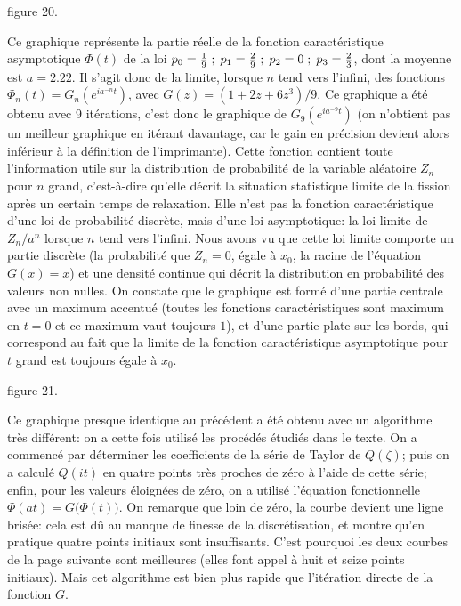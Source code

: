 \null
\vskip3pt
\centerline{ }
\vskip7mm
\centerline{\eightpoint figure 20.}
\vskip3mm
{\eightpoint\baselineskip=14pt
Ce graphique repr\'esente la partie r\'eelle de la fonction 
caract\'eristique asymptotique $\Phi (t)$ de la loi $p_0 = {1\over 9}
\;   ;\; p_1 = {2\over 9}\; ;\; p_2 = 0\; ;\; p_3 = {2\over 3}$, dont la
moyenne est $a = 2.22$. Il s'agit donc de la limite, lorsque $n$ tend vers 
l'infini, des fonctions $\Phi_n(t) = G_n(e^{ia^{-n}t})$, avec $G(z) = (1 + 
2z + 6z^3)/9$. Ce graphique a \'et\'e obtenu avec 9 it\'erations, c'est
donc   le graphique de $G_9(e^{ia^{-9}t})$ (on n'obtient pas un meilleur 
graphique en it\'erant davantage, car le gain en pr\'ecision devient alors 
inf\'erieur \`a la d\'efinition de l'imprimante). 
\medskip
Cette fonction contient toute l'information utile sur la distribution
de probabilit\'e de la variable al\'eatoire $Z_n$ pour $n$ grand, 
c'est-\`a-dire qu'elle d\'ecrit la situation statistique limite de la 
fission apr\`es un certain temps de relaxation. Elle n'est pas la fonction
caract\'eristique d'une loi de probabilit\'e discr\`ete, mais d'une
loi asymptotique: la loi limite de  $Z_n / a^n$ lorsque $n$ tend vers
l'infini. Nous avons vu que cette loi limite comporte un partie discr\`ete
(la probabilit\'e que $Z_n=0$, \'egale \`a $x_0$, la racine
de l'\'equation $G(x) = x$) et une densit\'e continue qui d\'ecrit
la distribution en probabilit\'e des valeurs non nulles. On constate que 
le graphique est form\'e d'une partie centrale avec un maximum 
accentu\'e (toutes les fonctions caract\'eristiques sont maximum en
$t=0$ et ce maximum vaut toujours $1$), et d'une partie plate sur les
bords, qui correspond au fait que la limite de la fonction 
caract\'eristique asymptotique pour $t$ grand est toujours \'egale \`a
$x_0$.}

\vfill\break

\null
\vskip3pt
\centerline{ }
\vskip15mm
\centerline{\eightpoint figure 21.}
\vskip4mm
\centerline{\vbox{\hsize=12cm\eightpoint \baselineskip=14pt
Ce graphique presque identique au pr\'ec\'edent a \'et\'e obtenu avec un 
algorithme tr\`es diff\'erent:  on a cette fois utilis\'e les proc\'ed\'es 
\'etudi\'es dans le texte.  On a commenc\'e par d\'eterminer les
coefficients de la s\'erie de Taylor de $Q(\zeta )$; puis on a calcul\'e
$Q(it)$ en quatre points tr\`es proches de z\'ero \`a l'aide de cette 
s\'erie; enfin, pour les valeurs \'eloign\'ees de z\'ero, on a utilis\'e
l'\'equation fonctionnelle $\Phi (at) = G\big( \Phi (t)\big)$. On remarque
que loin de z\'ero, la courbe devient une ligne bris\'ee: cela est d\^u au
manque de finesse de la discr\'etisation, et montre qu'en pratique  
quatre points initiaux sont insuffisants. C'est pourquoi les deux courbes
de la page suivante sont meilleures (elles font appel \`a huit et seize
points initiaux).  Mais cet algorithme est bien plus rapide que 
l'it\'eration directe de la fonction $G$. }} 
\vskip10mm
\vfill\break


